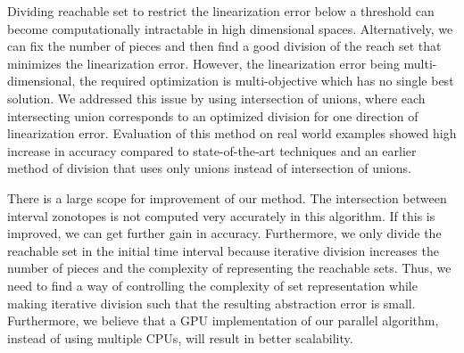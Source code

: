 Dividing reachable set to restrict the linearization error below a
threshold can become computationally intractable in high dimensional
spaces.  Alternatively, we can fix the number of pieces and then find
a good division of the reach set that minimizes the linearization
error.  However, the linearization error being multi-dimensional, the
required optimization is multi-objective which has no single best
solution.  We addressed this issue by using intersection of unions,
where each intersecting union corresponds to an optimized division for
one direction of linearization error.  Evaluation of this method on
real world examples showed high increase in accuracy compared to
state-of-the-art techniques and an earlier method of division that uses only unions instead of intersection of unions.

There is a large scope for improvement of our method.  The
intersection between interval zonotopes is not computed very
accurately in this algorithm.  If this is improved, we can get
further gain in accuracy.  Furthermore, we only divide the
reachable set in the initial time interval because iterative division
increases the number of pieces and the complexity of representing the
reachable sets.  Thus, we need to find a way of controlling the
complexity of set representation while making iterative division such
that the resulting abstraction error is small.  Furthermore, we
believe that a GPU implementation of our parallel algorithm,
instead of using multiple CPUs, will result in better scalability.

